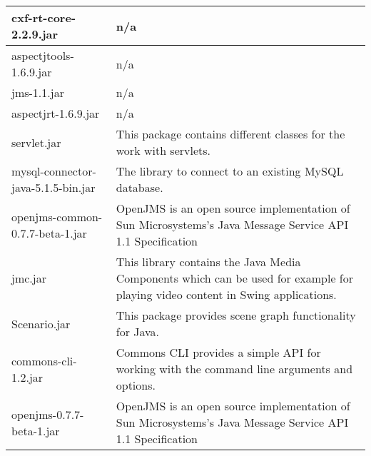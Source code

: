 \begin{center}
\begin{longtable}{|p{}|p{}|}
\hline 
cxf-rt-core-2.2.9.jar & n/a\\
\hline 
aspectjtools-1.6.9.jar & n/a\\
\hline 
jms-1.1.jar & n/a\\
\hline 
aspectjrt-1.6.9.jar & n/a\\
\hline 
servlet.jar & This package contains different classes for the work with servlets.\\
\hline 
mysql-connector-java-5.1.5-bin.jar & The library to connect to an existing MySQL database.\\
\hline 
openjms-common-0.7.7-beta-1.jar & OpenJMS is an open source implementation of Sun Microsystems's Java Message Service API 1.1 Specification\\
\hline 
jmc.jar & This library contains the Java Media Components which can be used for example for playing video content in Swing applications.\\
\hline 
Scenario.jar & This package provides scene graph functionality for Java.\\
\hline 
commons-cli-1.2.jar & Commons CLI provides a simple API for working with the command line arguments and options.\\
\hline 
openjms-0.7.7-beta-1.jar & OpenJMS is an open source implementation of Sun Microsystems's Java Message Service API 1.1 Specification\\
\hline 
\end{longtable}
\label{tabular:libraries}
\end{center}
